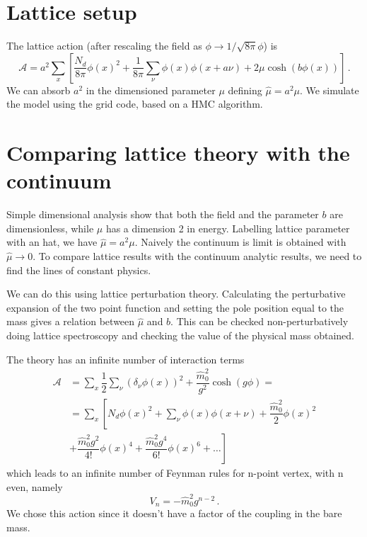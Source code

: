 \documentclass[12pt,a4paper]{report}
\begin{document}
\chapter{Lattice setup}

The lattice action (after rescaling the field as $\phi \to 1/\sqrt{8 \pi} \phi $) is \begin{equation}
\mathcal{A} = a^2 \sum_x \left[ \dfrac{N_d}{8 \pi} \phi(x)^2 + \dfrac{1}{8\pi} \sum_\nu \phi(x) \phi(x+ a \nu) +2  \mu \cosh(b\phi(x)) \right] \,.
\end{equation} We can absorb $a^2$ in the dimensioned parameter $\mu$ defining $\hat \mu = a^2 \mu$. We simulate the model using the grid code, based on a HMC algorithm.  


\chapter{Comparing lattice theory with the continuum }

Simple dimensional analysis show that both the field and the parameter $b$ are dimensionless, while $\mu$ has a dimension 2 in energy. Labelling lattice parameter with an hat, we have $\hat \mu = a^2 \mu$. Naively the continuum is limit is obtained  with $\hat \mu \to 0$. To compare lattice results with the continuum analytic results, we need to find the lines of constant physics.

We can do this using lattice perturbation theory. Calculating the perturbative expansion of the two point function and setting the pole position equal to the mass gives a relation between $ \hat \mu$ and $ b$. This can be checked non-perturbatively doing lattice spectroscopy and checking the value of the physical mass obtained.

The theory has an infinite number of interaction terms \begin{align}
\mathcal{A} &= \sum_x \dfrac{1}{2} \sum_\nu  (\delta_\nu \phi(x))^2 + \dfrac{\hat m_0^2}{g^2} \cosh(g \phi) =\\
  &= \sum_x \left[ N_d \phi(x)^2 +  \sum_\nu \phi(x) \phi(x+\nu) +  \dfrac{\hat m_0^2 }{2}\phi(x)^2 \right. \nonumber \\
  &\left. +   \dfrac{ \hat m_0^2 g^2}{4!} \phi(x)^4 +  \dfrac{ \hat m_0^2 g^4}{6!} \phi(x)^6 + \dots  \right]
\end{align} which leads to an infinite number of Feynman rules for n-point vertex, with n even, namely \begin{equation}
V_n = - \hat m_0^2 g^{n-2} \,.
\end{equation} We chose this action since it doesn't have a factor of the coupling in the bare mass. 
 
\end{document}
